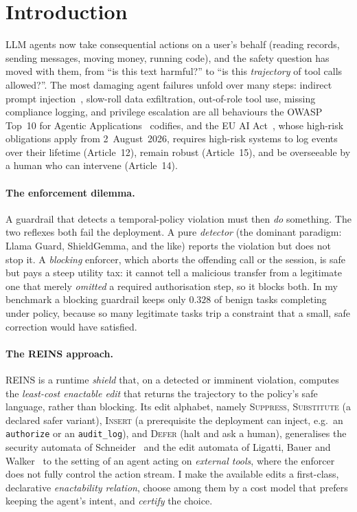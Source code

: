 \documentclass[11pt]{article}
\newcommand{\cupBlock}{0.328}\newcommand{\cupBlockSd}{0.078}
\begin{document}
\section{Introduction}

LLM agents now take consequential actions on a user's behalf (reading records,
sending messages, moving money, running code), and the safety question has moved
with them, from ``is this text harmful?'' to ``is this \emph{trajectory} of tool
calls allowed?''. The most damaging agent failures unfold over many steps:
indirect prompt injection~\citep{greshake2023indirect}, slow-roll data
exfiltration, out-of-role tool use, missing compliance logging, and privilege
escalation are all behaviours the OWASP Top~10 for Agentic
Applications~\citep{owasp2025agentic} codifies, and the EU AI
Act~\citep{euaiact2024}, whose high-risk obligations apply from
2~August~2026, requires high-risk systems to log events over their lifetime
(Article~12), remain robust (Article~15), and be overseeable by a human who can
intervene (Article~14).

\paragraph{The enforcement dilemma.} A guardrail that detects a temporal-policy
violation must then \emph{do} something. The two reflexes both fail the
deployment. A pure \emph{detector} (the dominant paradigm: Llama Guard,
ShieldGemma, and the like) reports the violation but does not stop it. A
\emph{blocking} enforcer, which aborts the offending call or the session, is safe
but pays a steep utility tax: it cannot tell a malicious transfer from a
legitimate one that merely \emph{omitted} a required authorisation step, so it
blocks both. In my benchmark a blocking guardrail keeps only $\cupBlock$ of
benign tasks completing under policy, because so many legitimate tasks trip a
constraint that a small, safe correction would have satisfied.

\paragraph{The REINS approach.} REINS is a runtime \emph{shield} that, on a
detected or imminent violation, computes the \emph{least-cost enactable edit}
that returns the trajectory to the policy's safe language, rather than blocking.
Its edit alphabet, namely \textsc{Suppress}, \textsc{Substitute} (a declared safer
variant), \textsc{Insert} (a prerequisite the deployment can inject, e.g.\ an
\texttt{authorize} or an \texttt{audit\_log}), and \textsc{Defer} (halt and ask a
human), generalises the security automata of Schneider~\citep{schneider2000enforceable}
and the edit automata of Ligatti, Bauer and Walker~\citep{ligatti2005edit} to the
setting of an agent acting on \emph{external tools}, where the enforcer does not
fully control the action stream. I make the available edits a first-class,
declarative \emph{enactability relation}, choose among them by a cost model that
prefers keeping the agent's intent, and \emph{certify} the choice.
\end{document}

